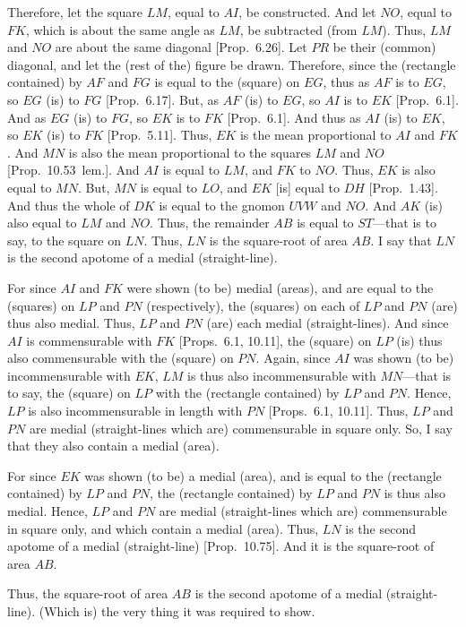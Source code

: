\begin{Parallel}{}{}
{Therefore, let the square $LM$, equal to $AI$, be constructed. And
let $NO$, equal to $FK$, which is about the same angle as $LM$, 
be subtracted (from $LM$). Thus, $LM$ and $NO$ are about the same
diagonal [Prop.~6.26]. Let $PR$ be their (common) diagonal,
and let the (rest of the) figure be drawn. Therefore, since
the (rectangle contained) by $AF$ and $FG$ is equal to the (square) on
$EG$, thus as $AF$ is to $EG$, so $EG$ (is) to $FG$
[Prop.~6.17]. But, as $AF$ (is) to $EG$, so
$AI$ is to $EK$ [Prop.~6.1]. And as $EG$ (is)
to $FG$, so $EK$ is to $FK$ [Prop.~6.1]. And thus
as $AI$ (is) to $EK$, so $EK$ (is) to $FK$ [Prop.~5.11]. Thus, $EK$
is the mean proportional to $AI$ and $FK$. And $MN$ is also the
mean proportional to the squares $LM$ and $NO$ [Prop.~10.53~lem.]. And $AI$
is equal to $LM$, and $FK$ to $NO$. Thus, $EK$ is also equal to $MN$.
But, $MN$ is equal to $LO$, and $EK$ [is] equal to $DH$ [Prop.~1.43]. And thus the whole
of $DK$ is equal to the gnomon $UVW$ and $NO$. And $AK$ (is) also
equal to $LM$ and $NO$. Thus, the remainder $AB$ is equal to $ST$---that 
is to say, to the square on $LN$. Thus, $LN$ is the square-root of area $AB$.
I say that $LN$ is the second apotome of a medial (straight-line).

For since $AI$ and $FK$ were shown (to be)
medial (areas), and are equal to the (squares) on $LP$ and $PN$ (respectively), the (squares) on each of $LP$ and $PN$ (are) thus also
medial. Thus, $LP$ and $PN$ (are) each medial (straight-lines).
And since $AI$ is commensurable with $FK$ [Props.~6.1, 10.11], the (square) on $LP$
(is) thus also commensurable with the (square) on $PN$.  Again, since
$AI$ was shown (to be) incommensurable with $EK$, $LM$ is thus
also incommensurable with $MN$---that is to say, the (square) on 
$LP$ with the (rectangle contained) by $LP$ and $PN$.
Hence, $LP$ is also incommensurable in length with $PN$ [Props.~6.1, 10.11]. Thus, $LP$ and $PN$
are medial (straight-lines which are) commensurable in square only.
So, I say that they also contain a medial (area).

For since $EK$ was shown (to be) a medial (area), and is equal to the
(rectangle contained) by $LP$ and $PN$, the (rectangle contained) by
$LP$ and $PN$ is thus also medial. Hence, $LP$ and $PN$
are medial (straight-lines which are) commensurable in square only, and
which contain a medial (area). Thus, $LN$ is the
second apotome of a medial (straight-line) [Prop.~10.75]. And it is the square-root of area
$AB$.

Thus, the square-root of area $AB$ is the second apotome of a medial (straight-line). (Which is) the very thing it was required to show.}
\end{Parallel}

